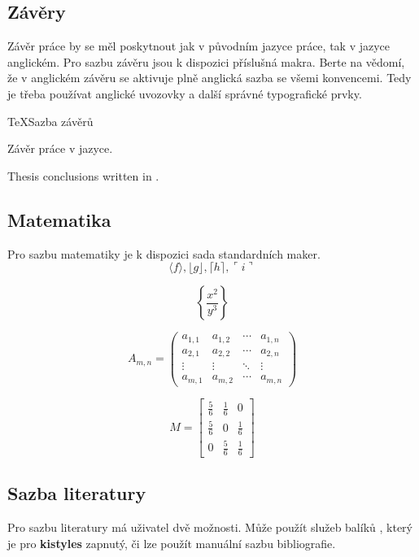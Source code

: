 \documentclass[
  biblatex,
  glossaries,
  index
]{kidiplom}
\begin{document}
\subsection{Závěry}
Závěr práce by se měl poskytnout jak v původním jazyce práce, tak v jazyce anglickém. Pro sazbu závěru jsou k dispozici příslušná makra. Berte na vědomí, že v anglickém závěru se aktivuje plně anglická sazba se všemi konvencemi. Tedy je třeba používat anglické uvozovky a další správné typografické prvky.

\begin{kicode}{TeX}{}{Sazba závěrů}
  \begin{kiconclusions}
    Závěr práce v  jazyce.
  \end{kiconclusions}

  \begin{kiconclusions}[english]
    Thesis conclusions written in .
  \end{kiconclusions}
\end{kicode}

\subsection{Matematika}
Pro sazbu matematiky je k dispozici sada standardních maker.
$$\langle f \rangle, \lfloor g \rfloor,
  \lceil h \rceil, \ulcorner i \urcorner$$

$$\left\{\frac{x^2}{y^3}\right\}$$

$$
  A_{m,n} =
  \begin{pmatrix}
    a_{1,1} & a_{1,2} & \cdots & a_{1,n} \\
    a_{2,1} & a_{2,2} & \cdots & a_{2,n} \\
    \vdots  & \vdots  & \ddots & \vdots  \\
    a_{m,1} & a_{m,2} & \cdots & a_{m,n}
  \end{pmatrix}
$$

$$
  M = \begin{bmatrix}
    \frac{5}{6} & \frac{1}{6} & 0           \\[0.3em]
    \frac{5}{6} & 0           & \frac{1}{6} \\[0.3em]
    0           & \frac{5}{6} & \frac{1}{6}
  \end{bmatrix}
$$

\subsection{Sazba literatury}
Pro sazbu literatury má uživatel dvě možnosti. Může použít služeb balíků \BibLaTeX{}, který je pro \textbf{kistyles} zapnutý, či lze použít manuální sazbu bibliografie.
\end{document}
